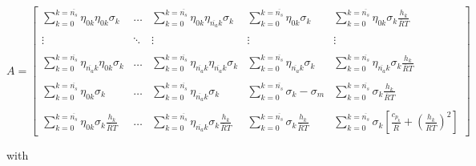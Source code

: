 \begin{equation}
	A = \left[
	\begin{array}{ccccc}
 		\sum_{k=0}^{k=\overline{n_s}}\eta_{0k}\eta_{0k}\sigma_k & \ldots & 
		\sum_{k=0}^{k=\overline{n_s}}\eta_{0k}\eta_{\overline{n_a}k}\sigma_k &
		\sum_{k=0}^{k=\overline{n_s}}\eta_{0k}\sigma_k & \sum_{k=0}^{k=\overline{n_s}}\eta_{0k}
		\sigma_k\frac{h_k}{\overline{R}T} \\ \\
		\vdots & \ddots & \vdots & \vdots & \vdots \\ \\
		\sum_{k=0}^{k=\overline{n_s}}\eta_{\overline{n_a}k}\eta_{0k}\sigma_k & \ldots & 
		\sum_{k=0}^{k=\overline{n_s}}\eta_{\overline{n_a}k}\eta_{\overline{n_a}k}\sigma_k &
		\sum_{k=0}^{k=\overline{n_s}}\eta_{\overline{n_a}k}\sigma_k & 
		\sum_{k=0}^{k=\overline{n_s}}\eta_{\overline{n_a}k}\sigma_k\frac{h_k}{\overline{R}T} \\ \\
		\sum_{k=0}^{k=\overline{n_s}}\eta_{0k}\sigma_k & \ldots & 
		\sum_{k=0}^{k=\overline{n_s}}\eta_{\overline{n_a}k}\sigma_k & 
		\sum_{k=0}^{k=\overline{n_s}}\sigma_k - \sigma_m & 
		\sum_{k=0}^{k=\overline{n_s}}\sigma_k\frac{h_k}{\overline{R}T} \\ \\
		\sum_{k=0}^{k=\overline{n_s}}\eta_{0k}\sigma_k\frac{h_k}{\overline{R}T} & \ldots &
		\sum_{k=0}^{k=\overline{n_s}}\eta_{\overline{n_a}k}\sigma_k\frac{h_k}{\overline{R}T} &
		\sum_{k=0}^{k=\overline{n_s}}\sigma_k\frac{h_k}{\overline{R}T} &
		\sum_{k=0}^{k=\overline{n_s}}\sigma_k[\frac{c_{p_k}}{\overline{R}} + (\frac{h_k}{\overline{R}T})^2]
	\end{array} \right] 
\label{eqn:matrix}
\end{equation}

	with

